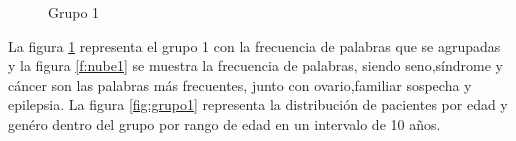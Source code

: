 \begin{figure}[h!]
	\centering
	\caption{Grupo 1}
	\label{f:grupo11}
\end{figure} 


La figura \ref{f:grupo11} representa el grupo 1 con la frecuencia de palabras que se agrupadas y la figura \ref{f:nube1}  se muestra la frecuencia de palabras, siendo seno,síndrome y cáncer son las palabras más frecuentes, junto con ovario,familiar sospecha y epilepsia. La figura \ref{fig:grupo1} representa la distribución de pacientes por edad y genéro dentro del grupo por rango de edad en un intervalo de 10 años.\\

